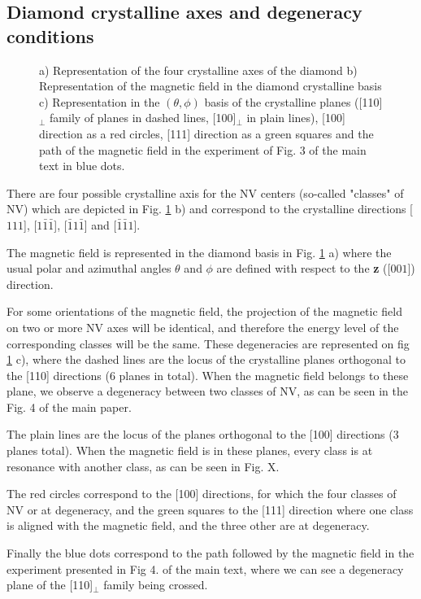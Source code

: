 \documentclass[preprintnumbers,amsmath,amssymb,onecolumn,12pt]{revtex4}
\begin{document}
\subsection{Diamond crystalline axes and degeneracy conditions}
\begin{figure}[!ht]
  \centering {}
  \caption{a) Representation of the four crystalline axes of the diamond b) Representation of the magnetic field in the diamond crystalline basis c) Representation in the $(\theta , \phi)$ basis of the crystalline planes ([110]$_\perp$ family of planes in dashed lines, [100]$_\perp$ in plain lines), [100] direction as a red circles, [111] direction as a green squares and the path of the magnetic field in the experiment of Fig. 3 of the main text in blue dots.}
	\label{cristallo}
\end{figure}
There are four possible crystalline axis for the NV centers (so-called "classes" of NV) which are depicted in Fig. \ref{cristallo} b) and correspond to the crystalline directions [$111$], [$1\bar 1 \bar 1$], [$\bar 1 1 \bar 1$] and [$\bar 1 \bar 1 1$]. 

The magnetic field is represented in the diamond basis in Fig. \ref{cristallo} a) where the usual polar and azimuthal angles $\theta$ and $\phi$ are defined with respect to the \textbf{z} ([$001$]) direction.

For some orientations of the magnetic field, the projection of the magnetic field on two or more NV axes will be identical, and therefore the energy level of the corresponding classes will be the same. These degeneracies are represented on fig \ref{cristallo} c), where the dashed lines are the locus of the crystalline planes orthogonal to the [110] directions (6 planes in total). When the magnetic field belongs to these plane, we observe a degeneracy between two classes of NV, as can be seen in the Fig. 4 of the main paper.

The plain lines are the locus of the planes orthogonal to the [100] directions (3 planes total). When the magnetic field is in these planes, every class is at resonance with another class, as can be seen in Fig. X.

The red circles correspond to the [100] directions, for which the four classes of NV or at degeneracy, and the green squares to the [111] direction where one class is aligned with the magnetic field, and the three other are at degeneracy.

Finally the blue dots correspond to the path followed by the magnetic field in the experiment presented in Fig 4. of the main text, where we can see a degeneracy plane of the [110]$_\perp$ family being crossed.
\end{document}

